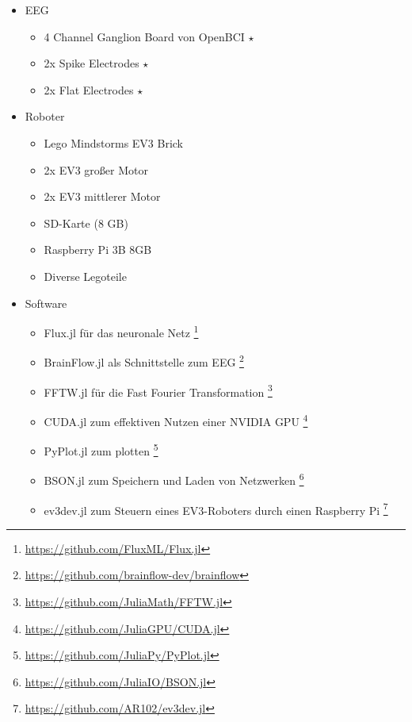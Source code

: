 \documentclass{scrartcl}
\begin{document}
	\begin{itemize}
		\item EEG
		\begin{itemize}
			\item 4 Channel Ganglion Board von OpenBCI $\star$
			\item 2x Spike Electrodes  $\star$
			\item 2x Flat Electrodes $\star$
		\end{itemize}

		\item Roboter
		\begin{itemize}
			\item Lego Mindstorms EV3 Brick
			\item 2x EV3 großer Motor
			\item 2x EV3 mittlerer Motor
			\item SD-Karte (8 GB)
			\item Raspberry Pi 3B 8GB
			\item Diverse Legoteile
		\end{itemize}

		\item Software
		\begin{itemize}
			\item Flux.jl für das neuronale Netz
				\footnote{\href{https://github.com/FluxML/Flux.jl}{https://github.com/FluxML/Flux.jl}}
				\cite{Flux.jl-2018}
				\cite{innes:2018}
			
			\item BrainFlow.jl als Schnittstelle zum EEG
				\footnote{\href{https://github.com/brainflow-dev/brainflow}{https://github.com/brainflow-dev/brainflow}}
				\cite{brainflow}
			
			\item FFTW.jl für die Fast Fourier Transformation
				\footnote{\href{https://github.com/JuliaMath/FFTW.jl}{https://github.com/JuliaMath/FFTW.jl}}
				\cite{FFTW.jl-2005}
			
			\item CUDA.jl zum effektiven Nutzen einer NVIDIA GPU
				\footnote{\href{https://github.com/JuliaGPU/CUDA.jl}{https://github.com/JuliaGPU/CUDA.jl}}
				\cite{CUDA}
			
			\item PyPlot.jl zum plotten
				\footnote{\href{https://github.com/JuliaPy/PyPlot.jl}{https://github.com/JuliaPy/PyPlot.jl}}
				\cite{pyplot}
			
			\item BSON.jl zum Speichern und Laden von Netzwerken
				\footnote{\href{https://github.com/JuliaIO/BSON.jl}{https://github.com/JuliaIO/BSON.jl}}
			
			\item ev3dev.jl zum Steuern eines EV3-Roboters durch einen Raspberry Pi
				\footnote{\href{https://github.com/AR102/ev3dev.jl}{https://github.com/AR102/ev3dev.jl}}
				\cite{ev3dev}
			
		\end{itemize}

	\end{itemize}
\end{document}
